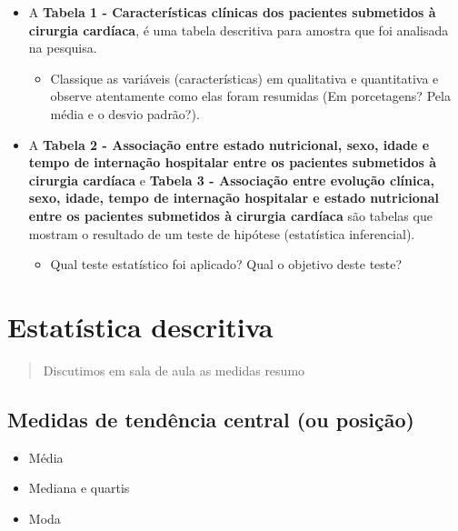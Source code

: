 \documentclass[
]{book}
\providecommand{\tightlist}{%
  \setlength{\itemsep}{0pt}\setlength{\parskip}{0pt}}
\begin{document}
\begin{itemize}
\item
  A \textbf{Tabela 1 - Características clínicas dos pacientes submetidos à cirurgia cardíaca}, é uma tabela descritiva para amostra que foi analisada na pesquisa.

  \begin{itemize}
  \tightlist
  \item
    Classique as variáveis (características) em qualitativa e quantitativa e observe atentamente como elas foram resumidas (Em porcetagens? Pela média e o desvio padrão?).
  \end{itemize}
\item
  A \textbf{Tabela 2 - Associação entre estado nutricional, sexo, idade e tempo de internação hospitalar entre os pacientes submetidos à cirurgia cardíaca} e \textbf{Tabela 3 - Associação entre evolução clínica, sexo, idade, tempo de internação hospitalar e estado nutricional entre os pacientes submetidos à cirurgia cardíaca} são tabelas que mostram o resultado de um teste de hipótese (estatística inferencial).

  \begin{itemize}
  \tightlist
  \item
    Qual teste estatístico foi aplicado? Qual o objetivo deste teste?
  \end{itemize}
\end{itemize}

\hypertarget{estatuxedstica-descritiva}{%
\chapter{Estatística descritiva}\label{estatuxedstica-descritiva}}

\begin{quote}
Discutimos em sala de aula as medidas resumo
\end{quote}

\hypertarget{medidas-de-tenduxeancia-central-ou-posiuxe7uxe3o}{%
\section{Medidas de tendência central (ou posição)}\label{medidas-de-tenduxeancia-central-ou-posiuxe7uxe3o}}

\begin{itemize}
\item
  Média
\item
  Mediana e quartis
\item
  Moda
\end{itemize}
\end{document}
